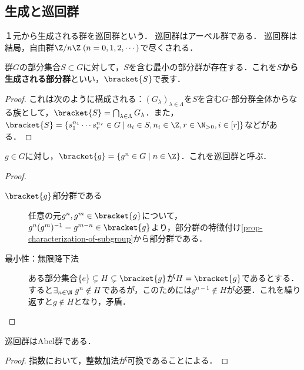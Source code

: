 \documentclass[uplatex,dvipdfmx]{jsreport}
\begin{document}
\subsection{生成と巡回群}

\begin{tcolorbox}[colframe=ForestGreen, colback=ForestGreen!10!white,breakable,colbacktitle=ForestGreen!40!white,coltitle=black,fonttitle=\bfseries\sffamily,
title=]
    １元から生成される群を巡回群という．
    巡回群はアーベル群である．
    巡回群は結局，自由群$\Z/n\Z\;(n=0,1,2,\cdots)$で尽くされる．
\end{tcolorbox}

\begin{lemma}[生成される群]
    群$G$の部分集合$S\subset G$に対して，$S$を含む最小の部分群が存在する．これを\textbf{$S$から生成される部分群}といい，$\bracket{S}$で表す．
\end{lemma}
\begin{proof}
    これは次のように構成される：$(G_\lambda)_{\lambda\in\Lambda}$を$S$を含む$G$-部分群全体からなる族として，$\bracket{S}=\bigcap_{\lambda\in\Lambda} G_\lambda$．また，$\bracket{S}=\{s_1^{n_1}\cdots s_r^{n_r}\in G\mid a_i\in S,n_i\in\Z,r\in\N_{>0},i\in[r]\}$などがある．
\end{proof}

\begin{lemma}[１元生成群が巡回群である]
    $g\in G$に対し，$\bracket{g}=\{g^n\in G\mid n\in\Z\}$．これを巡回群と呼ぶ．
\end{lemma}
\begin{proof}\mbox{}
    \begin{description}
        \item[$\bracket{g}$部分群である] 任意の元$g^n,g^m\in\bracket{g}$について，$g^n(g^m)^{-1}=g^{m-n}\in\bracket{g}$より，部分群の特徴付け\ref{prop-characterization-of-subgroup}から部分群である．
        \item[最小性：無限降下法] ある部分集合$\{e\}\subsetneq H\subsetneq\bracket{g}$が$H=\bracket{g}$であるとする．すると$\exists_{n\in\N}\;g^n\notin H$であるが，このためには$g^{n-1}\notin H$が必要．これを繰り返すと$g\notin H$となり，矛盾．
    \end{description}
\end{proof}

\begin{lemma}\label{lemma-cyclic-then-Abel}
    巡回群はAbel群である．
\end{lemma}
\begin{proof}
    指数において，整数加法が可換であることによる．
\end{proof}
\end{document}
